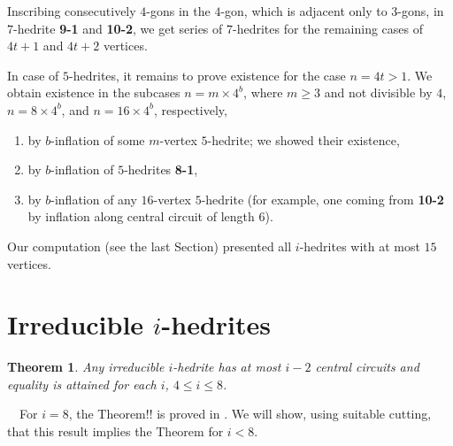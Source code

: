 \documentclass[12pt]{article}
\newtheorem{theorem}{Theorem}
\newcommand{\proof}{\noindent{\bf Proof.}\ \ }
\begin{document}
Inscribing consecutively $4$-gons in the $4$-gon, which is adjacent only to
$3$-gons, in $7$-hedrite {\bf 9-1} and {\bf 10-2}, we get series of 
$7$-hedrites for the remaining cases of $4t+1$ and $4t+2$ vertices.

In case of $5$-hedrites, it remains to prove existence for the 
case $n=4t>1$. We obtain existence in the subcases 
$n=m\times 4^b$, where $m\geq 3$ and not divisible by $4$, 
$n=8\times 4^b$, and $n=16\times 4^b$, respectively,
\begin{enumerate}
\item by $b$-inflation of some $m$-vertex $5$-hedrite; we showed their existence,
\item by $b$-inflation of $5$-hedrites {\bf 8-1},
\item by $b$-inflation of any $16$-vertex $5$-hedrite (for example, one coming from {\bf 10-2} by inflation along central circuit of length $6$).
\end{enumerate}





Our computation (see the last Section) presented all $i$-hedrites with at most $15$ vertices. 











\section{Irreducible $i$-hedrites}



\begin{theorem}\label{irre}
Any irreducible $i$-hedrite has at most $i-2$ central circuits and equality is attained for each $i$, $4\leq i\leq 8$.
\end{theorem}
\proof For $i=8$, the Theorem!! is proved in \cite{DSt}. We will show, using suitable cutting, that this result implies the Theorem for $i<8$.
\end{document}
